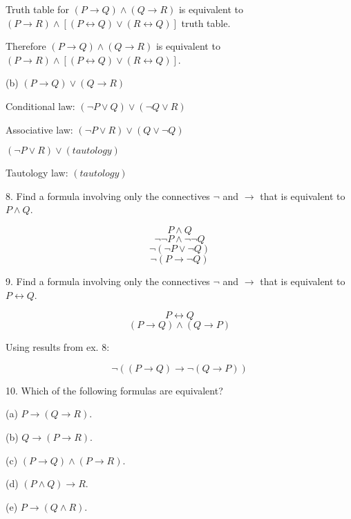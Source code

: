 \documentclass{article}
\begin{document}
Truth table for $(P \to Q) \land (Q \to R)$ is equivalent to $(P \to R) \land [(P \leftrightarrow Q) \lor (R \leftrightarrow Q)]$ truth table.

Therefore $(P \to Q) \land (Q \to R)$ is equivalent to $(P \to R) \land [(P \leftrightarrow Q) \lor (R \leftrightarrow Q)]$.

\vspace{20pt}

(b) $(P \to Q) \lor (Q \to R)$

Conditional law: $(\neg P \lor Q) \lor (\neg Q \lor R)$

Associative law: $(\neg P \lor R) \lor (Q \lor \neg Q)$

$(\neg P \lor R) \lor (tautology)$

Tautology law: $(tautology)$

\vspace{30pt}

8. Find a formula involving only the connectives $\neg$ and $\to$ that is equivalent to $P \land Q$.
\vspace{20pt}

$$P \land Q$$
$$\neg \neg P \land \neg \neg Q$$
$$\neg (\neg P \lor \neg Q)$$
$$\neg (P \to \neg Q)$$

\vspace{30pt}

9. Find a formula involving only the connectives $\neg$ and $\to$ that is equivalent to $P \leftrightarrow Q$.
\vspace{20pt}

$$P \leftrightarrow Q$$
$$(P \to Q) \land (Q \to P)$$

Using results from ex. 8:

$$\neg ((P \to Q) \to \neg (Q \to P))$$


\vspace{30pt}

10. Which of the following formulas are equivalent?

\hspace{12pt}(a) $P \to (Q \to R)$.

\hspace{12pt}(b) $Q \to (P \to R)$.

\hspace{12pt}(c) $(P \to Q) \land (P \to R)$.

\hspace{12pt}(d) $(P \land Q) \to R$.

\hspace{12pt}(e) $P \to (Q \land R)$.
\vspace{20pt}
\end{document}
